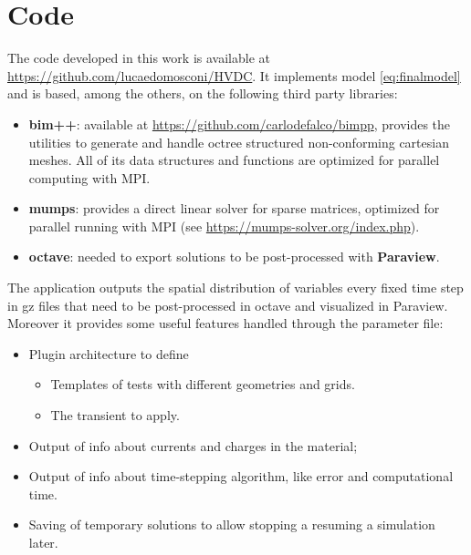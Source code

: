 \documentclass[11pt,a4paper]{article}
\begin{document}
\section{Code}
The code developed in this work is available at \url{https://github.com/lucaedomosconi/HVDC}. It implements model \eqref{eq:finalmodel} and is based, among the others, on the following third party libraries:
\begin{itemize}
	\item \textbf{bim++}: available at \url{https://github.com/carlodefalco/bimpp}, provides the utilities to generate and handle octree structured non-conforming cartesian meshes. All of its data structures and functions are optimized for parallel computing with MPI.
	\item \textbf{mumps}: provides a direct linear solver for sparse matrices, optimized for parallel running with MPI (see \url{https://mumps-solver.org/index.php}).
	\item \textbf{octave}: needed to export solutions to be post-processed with \textbf{Paraview}.
\end{itemize}
The application outputs the spatial distribution of variables every fixed time step in gz files that need to be post-processed in octave and visualized in Paraview. Moreover it provides some useful features handled through the parameter file:
\begin{itemize}
	\item Plugin architecture to define
	\begin{itemize}
		\item Templates of tests with different geometries and grids.
		\item The transient to apply.
	\end{itemize}
	\item Output of info about currents and charges in the material;
	\item Output of info about time-stepping algorithm, like error and computational time.
	\item Saving of temporary solutions to allow stopping a resuming a simulation later.
\end{itemize}
\end{document}
